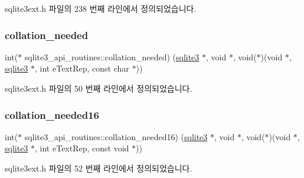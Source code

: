 sqlite3ext.\+h 파일의 238 번째 라인에서 정의되었습니다.

\mbox{\label{structsqlite3__api__routines_a4ecc8645b639cabe1fb630aceaec9017}} 
\subsubsection{\texorpdfstring{collation\+\_\+needed}{collation\_needed}}
{\footnotesize\ttfamily int($\ast$ sqlite3\+\_\+api\+\_\+routines\+::collation\+\_\+needed) (\hyperlink{sqlite3_8h_a0ef6f2646262c8a9b24368d8ac140f69}{sqlite3} $\ast$, void $\ast$, void($\ast$)(void $\ast$, \hyperlink{sqlite3_8h_a0ef6f2646262c8a9b24368d8ac140f69}{sqlite3} $\ast$, int e\+Text\+Rep, const char $\ast$))}



sqlite3ext.\+h 파일의 50 번째 라인에서 정의되었습니다.

\mbox{\label{structsqlite3__api__routines_aa035538977ec61fe6df923b78db33962}} 
\subsubsection{\texorpdfstring{collation\+\_\+needed16}{collation\_needed16}}
{\footnotesize\ttfamily int($\ast$ sqlite3\+\_\+api\+\_\+routines\+::collation\+\_\+needed16) (\hyperlink{sqlite3_8h_a0ef6f2646262c8a9b24368d8ac140f69}{sqlite3} $\ast$, void $\ast$, void($\ast$)(void $\ast$, \hyperlink{sqlite3_8h_a0ef6f2646262c8a9b24368d8ac140f69}{sqlite3} $\ast$, int e\+Text\+Rep, const void $\ast$))}



sqlite3ext.\+h 파일의 52 번째 라인에서 정의되었습니다.

\mbox{\label{structsqlite3__api__routines_aea28365a58adb937fbdf3983fe080e1a}} 
